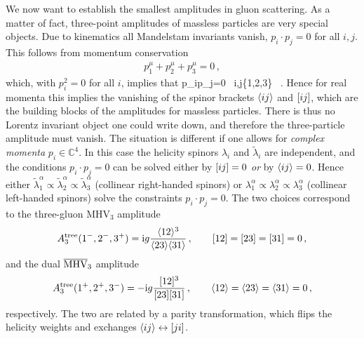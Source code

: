 We now want to establish the smallest amplitudes in gluon scattering. As a matter of
fact, three-point amplitudes of massless particles are very special objects. Due to
kinematics all Mandelstam invariants vanish, $p_{i}\cdot p_{j}=0$ for all $i,j$. This follows from 
momentum conservation
\begin{align}
p_{1}^{\mu}+p_{2}^{\mu}+p_{3}^{\mu}=0 \,,
\end{align}
which, with $p_i^2=0$ for all $i$, implies that 
\be
p_{i}\cdot p_{j}=0 \quad \forall \, i,j\in \{1,2,3\} \, .
\ee
%
Hence for real momenta this implies the vanishing of the spinor brackets
$\langle ij\rangle$ and $[ij]$, which are the building blocks of the amplitudes for massless
particles. There is thus no Lorentz invariant object one could write down, and therefore
the three-particle amplitude must vanish.
The situation is different if one allows for {\it complex momenta} $p_{i} \in {\mathbb{C}^{4}}$.
In this case the helicity spinors
 $\lambda_{i}$ and $\tilde{\lambda}_{i}$ are independent, and the conditions $p_{i} \cdot p_{j} =0 $
can be solved either by $[i j] = 0$
\emph{or} by $\langle i j\rangle =0$.
Hence either $\tilde\lambda_{1}^{\alpha} \propto \tilde\lambda_{2}^{\alpha} \propto 
\tilde\lambda_{3}^{\alpha}$ (collinear right-handed spinors) or
$\lambda_{1}^{\alpha} \propto \lambda_{2}^{\alpha} \propto 
\lambda_{3}^{\alpha}$ (collinear left-handed spinors) solve the constraints
$p_{i}\cdot p_{j}=0$.
The two choices correspond to the three-gluon MHV${}_{3}$ 
amplitude
\begin{eqnarray}\label{3pointmhv}
A_{3}^{\text{tree}}(1^{-},2^{-},3^{+}) = \mathrm{i} g\frac{ \langle12\rangle^3 }{\langle23\rangle\langle31\rangle}\,,\qquad \lbrack 12\rbrack=\lbrack2 3\rbrack = \lbrack 3 1\rbrack = 0\,, 
\end{eqnarray}
and the dual $\overline{\text{MHV}}_{3}$ amplitude
\begin{eqnarray} \label{3pointmhvbar}
A_{3}^{\text{tree}}(1^{+},2^{+},3^{-}) = - \mathrm{i} g\frac{ [12]^3 }{[23][31]}\,,\qquad \langle1 2\rangle= \langle2 3\rangle = \langle3 1\rangle = 0\,, 
\end{eqnarray}
respectively. The two are related by a parity transformation, which flips the helicity weights and exchanges $\langle i j \rangle \leftrightarrow [ji]$.

